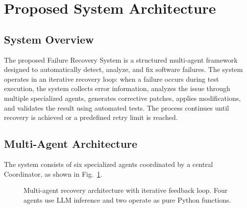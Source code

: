 \documentclass[conference]{IEEEtran}
\begin{document}
\section{Proposed System Architecture}

\subsection{System Overview}
The proposed Failure Recovery System is a structured multi-agent framework designed to automatically detect, analyze, and fix software failures. The system operates in an iterative recovery loop: when a failure occurs during test execution, the system collects error information, analyzes the issue through multiple specialized agents, generates corrective patches, applies modifications, and validates the result using automated tests. The process continues until recovery is achieved or a predefined retry limit is reached.

\subsection{Multi-Agent Architecture}
The system consists of six specialized agents coordinated by a central Coordinator, as shown in Fig.~\ref{fig:architecture}.

\begin{figure}[htbp]
\centerline{}
\caption{Multi-agent recovery architecture with iterative feedback loop. Four agents use LLM inference and two operate as pure Python functions.}
\label{fig:architecture}
\end{figure}
\end{document}

